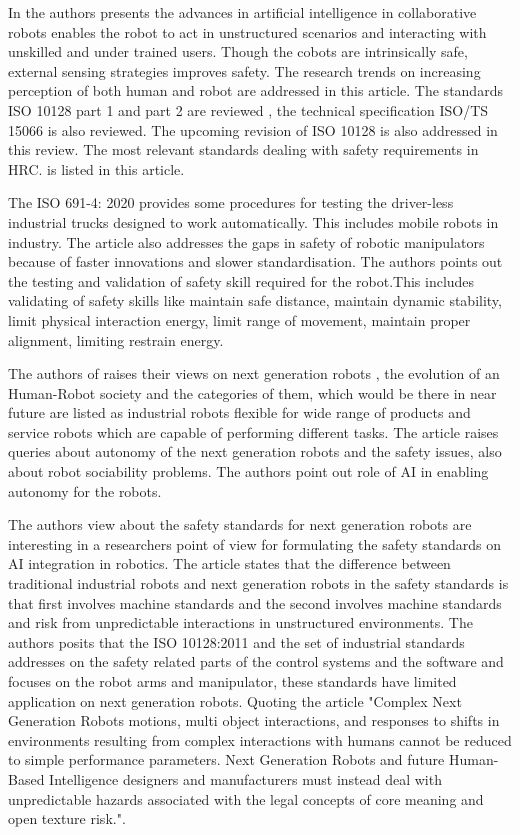 {In\cite{author7} the authors presents the advances in artificial intelligence in collaborative robots enables the robot to act in unstructured scenarios and interacting with unskilled and under trained users. Though the cobots are intrinsically safe, external sensing strategies improves safety.  The research trends on increasing perception of both human and robot are addressed in this article. The standards ISO 10128 part 1 and part 2 are reviewed , the technical specification ISO/TS 15066 is also reviewed. The upcoming revision of ISO 10128 is also addressed in this review. The most relevant standards dealing with safety requirements in HRC. is listed in this article. 

The ISO 691-4: 2020 provides some procedures for testing the driver-less industrial trucks designed to work automatically. This includes mobile robots in industry. The article also addresses the gaps in safety of robotic manipulators because of faster innovations and slower standardisation. The authors points out the testing and validation of  safety skill required for the robot.This includes validating of safety skills like maintain safe distance, maintain dynamic stability, limit physical interaction energy, limit range of movement, maintain proper alignment, limiting restrain energy.

 The authors of \cite{author8} raises their views on next generation robots , the evolution of an Human-Robot society and the categories of them, which would be there in near future are listed as industrial robots flexible for wide range of products and service robots which are capable of performing different tasks. The article raises queries about autonomy of the next generation robots and the safety issues, also about robot sociability problems. The authors point out role of AI in enabling autonomy for the robots.

 The authors view about the safety standards for next generation robots are interesting in a researchers point of view for formulating the safety standards on AI integration in robotics. The article states that the difference between traditional industrial robots and next generation robots in the safety standards is that first involves machine standards and the second involves machine standards and risk from unpredictable interactions in unstructured environments. The authors posits that the ISO 10128:2011 and the set of industrial standards addresses on the safety related parts of the control systems and the software and focuses on the robot arms and manipulator, these standards have limited application on next generation robots. Quoting the article "Complex Next Generation Robots motions, multi object interactions, and responses to shifts in environments resulting from complex interactions with humans cannot be reduced to simple performance parameters. Next Generation Robots and future Human-Based Intelligence designers and manufacturers must instead deal with unpredictable hazards associated with the legal concepts of core meaning and open texture risk."\cite{author8}.
 
}
